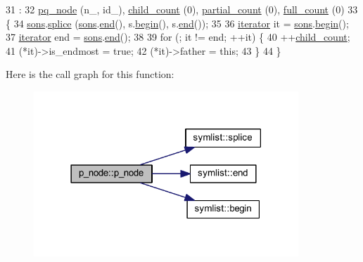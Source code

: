 \begin{DoxyCode}
31                                                       : 
32     \mbox{\hyperlink{classpq__node_a75720c94fd6e2865ba24c76ff66b33b2}{pq\_node}} (n\_, id\_), \mbox{\hyperlink{classp__node_a74d5be4f6767bda5b5803dc2f0987b74}{child\_count}} (0), \mbox{\hyperlink{classp__node_a9ac93f9a0f474dcc74312e820fde73b6}{partial\_count}} (0), 
      \mbox{\hyperlink{classp__node_a67a7570ace6b26d3bcbff7cf71c85cb0}{full\_count}} (0)
33 \{
34     \mbox{\hyperlink{classpq__node_a2cc030cfa4560872acea8b50ebd0542b}{sons}}.\mbox{\hyperlink{classsymlist_ac2bd4d9db62ea6a3282662c62a97c3b2}{splice}} (\mbox{\hyperlink{classpq__node_a2cc030cfa4560872acea8b50ebd0542b}{sons}}.\mbox{\hyperlink{classsymlist_a7283589fa01f79d722f8256d7a6a7883}{end}}(), s.\mbox{\hyperlink{classsymlist_a525b8d44af5d771fe15916372515cce0}{begin}}(), s.\mbox{\hyperlink{classsymlist_a7283589fa01f79d722f8256d7a6a7883}{end}}());
35 
36     \mbox{\hyperlink{classpq__node_a34898c9eb1527787c07e8ebefd6bfba5}{iterator}} it = \mbox{\hyperlink{classpq__node_a2cc030cfa4560872acea8b50ebd0542b}{sons}}.\mbox{\hyperlink{classsymlist_a525b8d44af5d771fe15916372515cce0}{begin}}();
37     \mbox{\hyperlink{classpq__node_a34898c9eb1527787c07e8ebefd6bfba5}{iterator}} end = \mbox{\hyperlink{classpq__node_a2cc030cfa4560872acea8b50ebd0542b}{sons}}.\mbox{\hyperlink{classsymlist_a7283589fa01f79d722f8256d7a6a7883}{end}}();
38 
39     \textcolor{keywordflow}{for} (; it != end; ++it) \{
40     ++\mbox{\hyperlink{classp__node_a74d5be4f6767bda5b5803dc2f0987b74}{child\_count}};
41     (*it)->is\_endmost = \textcolor{keyword}{true};
42     (*it)->father = \textcolor{keyword}{this};
43     \}
44 \} 
\end{DoxyCode}
Here is the call graph for this function\+:\nopagebreak
\begin{figure}[H]
\begin{center}
\leavevmode
\includegraphics[width=282pt]{classp__node_a043eab88f783cf3e3928fa1986a91ff6_cgraph}
\end{center}
\end{figure}


